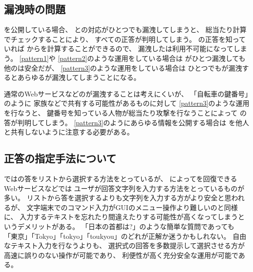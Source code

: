 \documentclass[twoside]{wiss}
\begin{document}

%
\subsection{{\PW}漏洩時の問題}

{\SQ}を公開している場合、
{\SS}と{\PW}の対応がひとつでも漏洩してしまうと、
総当たり計算でチェックすることにより、
すべて{\SQ}の正答が判明してしまう。
{\SQ}の正答を知っていれば
{\SS}から{\PW}を計算することができるので、
漏洩した{\SQ}は利用不可能になってしまう。
%
\ref{pattern1}や
\ref{pattern2}のような運用をしている場合は
{\PW}がひとつ漏洩しても他の{\PW}は安全だが、
\ref{pattern3}のような運用をしている場合は
ひとつでも{\PW}が漏洩するとあらゆる{\PW}が漏洩してしまうことになる。

通常のWebサービスなどの{\PW}が漏洩することは考えにくいが、
「自転車の鍵番号」のように
家族などで共有する可能性があるものに対して
\ref{pattern3}のような運用を行なうと、
鍵番号を知っている人物が総当たり攻撃を行なうことによって
{\SQ}の答が判明してしまう。
\ref{pattern3}のようにあらゆる情報を公開する場合は
{\PW}を他人と共有しないように注意する必要がある。

\subsection{正答の指定手法について}

{\EP}では{\SQ}の答をリストから選択する方法をとっているが、
{\SQ}によって{\PW}を回復できるWebサービスなどでは
ユーザが回答文字列を入力する方法をとっているものが多い。
リストから答を選択するよりも文字列を入力する方がより安全と思われるが、
文字端末でのコマンド入力がGUIのメニュー操作より難しいのと同様に、
入力するテキストを忘れたり間違えたりする可能性が高くなってしまうというデメリットがある。
「日本の首都は?」のような簡単な質問であっても
「東京」「Tokyo」「tokyo」「toukyou」のどれが正解か迷うかもしれない。
自由なテキスト入力を行なうよりも、
選択式の回答を多数提示して選択させる方が高速に誤りのない操作が可能であり、
利便性が高く充分安全な運用が可能である。

% 
% 
% 
% 
% 
\end{document}
